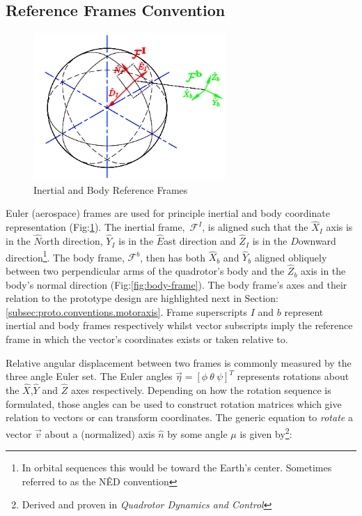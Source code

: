 \subsection{Reference Frames Convention}
\label{subsec:proto.conventions.frames}
\begin{figure}[htbp]
\centering
\includegraphics[width=0.65\textwidth]{figs/reference-frame}
\caption{Inertial and Body Reference Frames}
\label{fig:ref_frame}
\end{figure}
Euler (aerospace) frames are used for principle inertial and body coordinate representation (Fig:\ref{fig:ref_frame}). The inertial frame,~$\mathcal{F}^I$, is aligned such that the $\hat{X}_I$ axis is in the $\hat{N}$orth direction, $\hat{Y}_I$ is in the $\hat{E}$ast direction and $\hat{Z}_I$ is  in the $\hat{D}$ownward direction\footnote{In orbital sequences this would be toward the Earth's center. Sometimes referred to as the N\^{E}D convention}. The body frame, $\mathcal{F}^b$, then has both $\hat{X}_b$ and $\hat{Y}_b$ aligned obliquely between two perpendicular arms of the quadrotor's body and the $\hat{Z}_b$ axis in the body's normal direction (Fig:\ref{fig:body-frame}). The body frame's axes and their relation to the prototype design are highlighted next in Section:\ref{subsec:proto.conventions.motoraxis}. Frame superscripts $I$ and $b$ represent inertial and body frames respectively whilst vector subscripts imply the reference frame in which the vector's coordinates exists or taken relative to.
\par
Relative angular displacement between two frames is commonly measured by the three angle Euler set. The Euler angles $\vec{\eta}=[\phi ~\theta ~\psi]^T$ represents rotations about the $\hat{X}$,$\hat{Y}$ and $\hat{Z}$ axes respectively. Depending on how the rotation sequence is formulated, those angles can be used to construct rotation matrices which give relation to vectors or can transform coordinates. The generic equation to \emph{rotate} a vector $\vec{v}$ about a (normalized) axis $\hat{n}$ by some angle $\mu$ is given by\footnote{Derived and proven in \emph{Quadrotor Dynamics and Control}\cite{quaddynamics}}:
